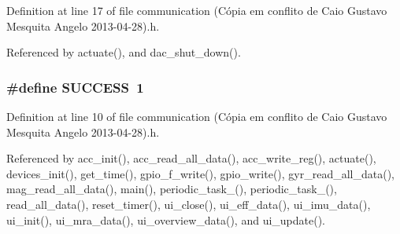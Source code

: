 Definition at line 17 of file communication (\-Cópia em conflito de Caio Gustavo Mesquita Angelo 2013-\/04-\/28).\-h.



Referenced by actuate(), and dac\-\_\-shut\-\_\-down().

\hypertarget{communication_01_07C_xC3_xB3pia_01em_01conflito_01de_01Caio_01Gustavo_01Mesquita_01Angelo_012013-04-28_08_8h_aa90cac659d18e8ef6294c7ae337f6b58}{
\subsubsection[{S\-U\-C\-C\-E\-S\-S}]{\setlength{\rightskip}{0pt plus 5cm}\#define S\-U\-C\-C\-E\-S\-S~1}}\label{communication_01_07C_xC3_xB3pia_01em_01conflito_01de_01Caio_01Gustavo_01Mesquita_01Angelo_012013-04-28_08_8h_aa90cac659d18e8ef6294c7ae337f6b58}


Definition at line 10 of file communication (\-Cópia em conflito de Caio Gustavo Mesquita Angelo 2013-\/04-\/28).\-h.



Referenced by acc\-\_\-init(), acc\-\_\-read\-\_\-all\-\_\-data(), acc\-\_\-write\-\_\-reg(), actuate(), devices\-\_\-init(), get\-\_\-time(), gpio\-\_\-f\-\_\-write(), gpio\-\_\-write(), gyr\-\_\-read\-\_\-all\-\_\-data(), mag\-\_\-read\-\_\-all\-\_\-data(), main(), periodic\-\_\-task\-\_(), periodic\-\_\-task\-\_(), read\-\_\-all\-\_\-data(), reset\-\_\-timer(), ui\-\_\-close(), ui\-\_\-eff\-\_\-data(), ui\-\_\-imu\-\_\-data(), ui\-\_\-init(), ui\-\_\-mra\-\_\-data(), ui\-\_\-overview\-\_\-data(), and ui\-\_\-update().



